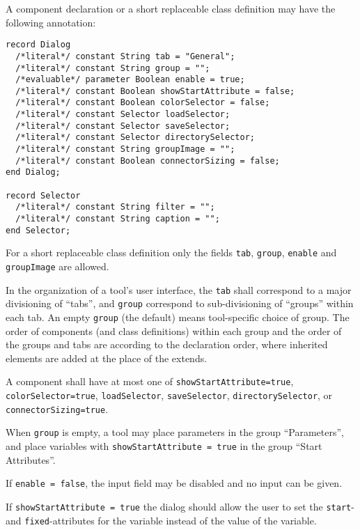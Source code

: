 A component declaration or a short replaceable class definition may have the following annotation:
\begin{lstlisting}[language=modelica]
record Dialog
  /*literal*/ constant String tab = "General";
  /*literal*/ constant String group = "";
  /*evaluable*/ parameter Boolean enable = true;
  /*literal*/ constant Boolean showStartAttribute = false;
  /*literal*/ constant Boolean colorSelector = false;
  /*literal*/ constant Selector loadSelector;
  /*literal*/ constant Selector saveSelector;
  /*literal*/ constant Selector directorySelector;
  /*literal*/ constant String groupImage = "";
  /*literal*/ constant Boolean connectorSizing = false;
end Dialog;

record Selector
  /*literal*/ constant String filter = "";
  /*literal*/ constant String caption = "";
end Selector;
\end{lstlisting}%

For a short replaceable class definition only the fields \lstinline!tab!, \lstinline!group!, \lstinline!enable! and \lstinline!groupImage! are allowed.

In the organization of a tool's user interface, the \lstinline!tab! shall correspond to a major divisioning of ``tabs'', and \lstinline!group! correspond to sub-divisioning of ``groups'' within each tab.
An empty \lstinline!group! (the default) means tool-specific choice of group.
The order of components (and class definitions) within each group and the order of the groups and tabs are according to the declaration order, where inherited elements are added at the place of the extends.

A component shall have at most one of \lstinline!showStartAttribute=true!, \lstinline!colorSelector=true!, \lstinline!loadSelector!, \lstinline!saveSelector!, \lstinline!directorySelector!, or \lstinline!connectorSizing=true!.

\begin{example}
When \lstinline!group! is empty, a tool may place parameters in the group ``Parameters'', and place variables with \lstinline!showStartAttribute = true! in the group ``Start Attributes''.
\end{example}

If \lstinline!enable = false!, the input field may be disabled and no input can be given.

If \lstinline!showStartAttribute = true! the dialog should allow the user to set the \lstinline!start!- and \lstinline!fixed!-attributes for the variable instead of the value of the variable.

